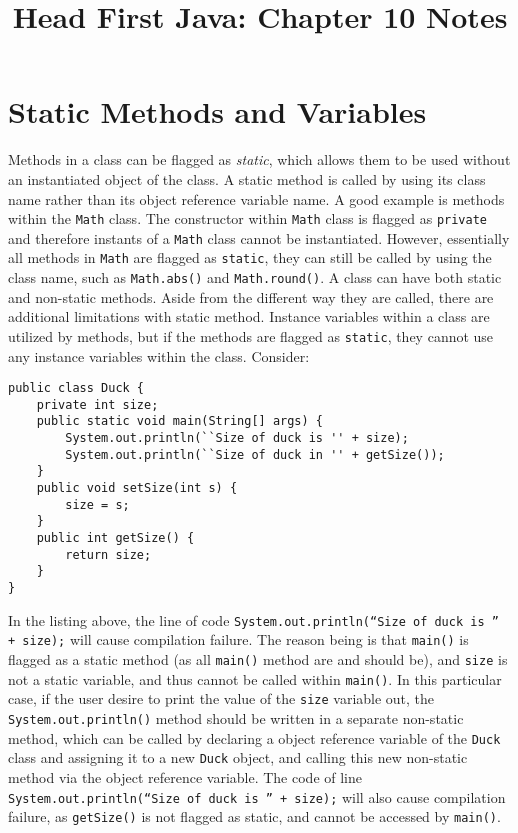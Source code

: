 \documentclass{tufte-handout}
\title{Head First Java: Chapter 10 Notes}
\begin{document}
    \maketitle

    \section*{Static Methods and Variables}
    Methods in a class can be flagged as \emph{static}, which allows them to be used without an instantiated object of the class. A static method is called by using its class name rather than its object reference variable name. A good example is methods within the \texttt{Math} class. The constructor within \texttt{Math} class is flagged as \texttt{private} and therefore instants of a \texttt{Math} class cannot be instantiated. However, essentially all methods in \texttt{Math} are flagged as \texttt{static}, they can still be called by using the class name, such as \texttt{Math.abs()} and \texttt{Math.round()}. A class can have both static and non-static methods. Aside from the different way they are called, there are additional limitations with static method. Instance variables within a class are utilized by methods, but if the methods are flagged as \texttt{static}, they cannot use any instance variables within the class. Consider:

    \begin{lstlisting}
public class Duck {
    private int size;
    public static void main(String[] args) {
        System.out.println(``Size of duck is '' + size);
        System.out.println(``Size of duck in '' + getSize());
    }
    public void setSize(int s) {
        size = s;
    }
    public int getSize() {
        return size;
    }
}     
    \end{lstlisting}

    In the listing above, the line of code \texttt{System.out.println(``Size of duck is '' + size);} will cause compilation failure. The reason being is that \texttt{main()} is flagged as a static method (as all \texttt{main()} method are and should be), and \texttt{size} is not a static variable, and thus cannot be called within \texttt{main()}. In this particular case, if the user desire to print the value of the \texttt{size} variable out, the \texttt{System.out.println()} method should be written in a separate non-static method, which can be called by declaring a object reference variable of the \texttt{Duck} class and assigning it to a new \texttt{Duck} object, and calling this new non-static method via the object reference variable. The code of line \texttt{System.out.println(``Size of duck is '' + size);} will also cause compilation failure, as \texttt{getSize()} is not flagged as static, and cannot be accessed by \texttt{main()}. 
\end{document}
